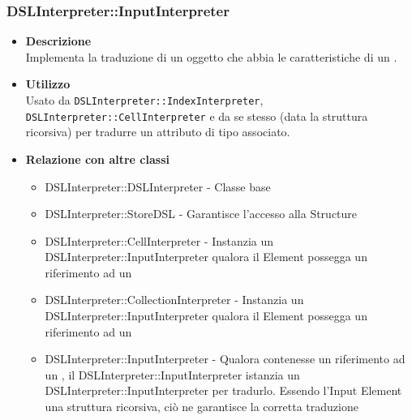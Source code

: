 \subsubsection{DSLInterpreter::InputInterpreter}
\begin{itemize}
\item \textbf{Descrizione} \hfill \\
  Implementa la traduzione di un oggetto che abbia le caratteristiche di un .
\item \textbf{Utilizzo} \hfill \\
  Usato da \texttt{DSLInterpreter::IndexInterpreter}, \texttt{DSLInterpreter::CellInterpreter} e da se stesso (data la struttura ricorsiva) per tradurre un attributo di tipo  associato.
\item \textbf{Relazione con altre classi}
  \begin{itemize}
  \item DSLInterpreter::DSLInterpreter - Classe base
  \item DSLInterpreter::StoreDSL - Garantisce l'accesso alla  Structure
  \item DSLInterpreter::CellInterpreter - Instanzia un DSLInterpreter::InputInterpreter qualora il  Element possegga un riferimento ad un 
  \item DSLInterpreter::CollectionInterpreter - Instanzia un DSLInterpreter::InputInterpreter qualora il  Element possegga un riferimento ad un 
  \item DSLInterpreter::InputInterpreter - Qualora  contenesse un riferimento ad un , il DSLInterpreter::InputInterpreter istanzia un DSLInterpreter::InputInterpreter per tradurlo. Essendo l'Input Element una struttura ricorsiva, ciò ne garantisce la corretta traduzione
  \end{itemize}
\end{itemize}
